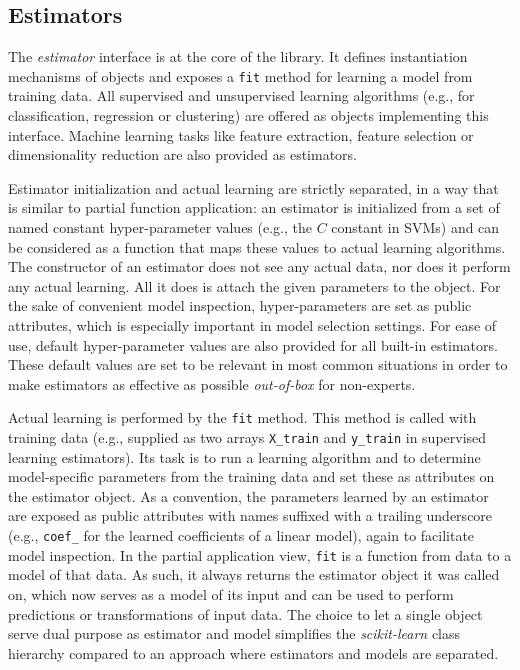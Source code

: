\documentclass{llncs}
\newcommand{\sklearn}{\textit{scikit-learn}\xspace}
\begin{document}
\subsection{Estimators}
\label{sec:estimators}

The \textit{estimator} interface is at the core of the
library. It defines instantiation mechanisms of objects and exposes a
\texttt{fit} method for learning a model from training data.  All supervised and
unsupervised learning algorithms (e.g., for classification, regression or
clustering) are offered as objects implementing this interface. Machine
learning tasks like feature extraction, feature selection or dimensionality
reduction are also provided as estimators.

Estimator initialization and actual learning are strictly separated,
in a way that is similar to partial function application:
an estimator is initialized from a set of named constant hyper-parameter values
(e.g., the $C$ constant in SVMs)
and can be considered as a function
that maps these values to actual learning algorithms.
The constructor of an estimator does not see any actual data, nor does it perform any actual learning.
All it does is attach the given parameters to the object.
For the sake of convenient model inspection, hyper-parameters are set as public attributes,
which is especially important in model selection settings.
For ease of use, default hyper-parameter values are also provided
for all built-in estimators.
These default values are set to be relevant in most common
situations in order to make estimators as effective as possible
\textit{out-of-box} for non-experts.

Actual learning is performed by the \texttt{fit} method. This method is called
with training data (e.g., supplied as two arrays \texttt{X\_train} and
\texttt{y\_train} in supervised learning estimators). Its task is to run a
learning algorithm and to determine model-specific parameters from the training
data and set these as attributes on the estimator object. As a convention, the
parameters learned by an estimator are exposed as public attributes with names
suffixed with a trailing underscore (e.g., \texttt{coef\_} for the
learned coefficients of a linear model),
again to facilitate model inspection.
In the partial application view,
\texttt{fit} is a function from data to a model of that data.
As such, it always returns the estimator object it was called on,
which now serves as a model of its input and can be used to perform predictions or transformations of input data.
The choice to let a single object serve dual purpose as estimator and model
simplifies the \sklearn class hierarchy
compared to an approach where estimators and models are separated.
\end{document}

